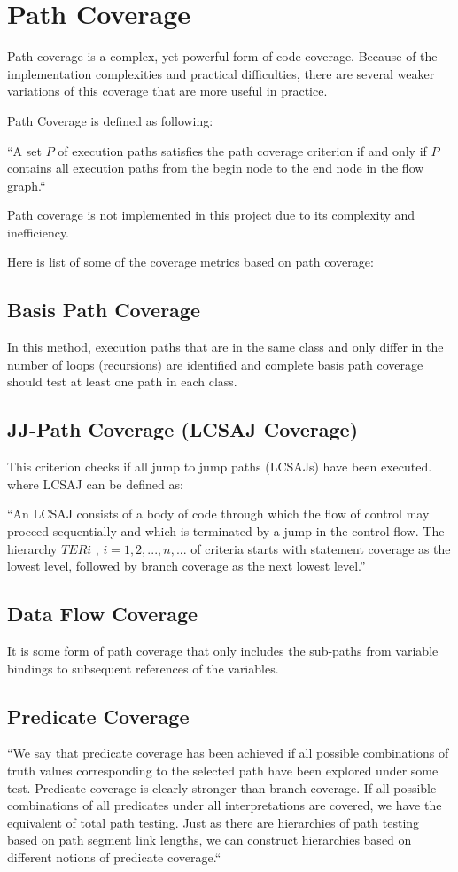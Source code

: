 \documentclass[12pt,a4paper]{report}
\begin{document}
\section{Path Coverage}
Path coverage is a complex, yet powerful form of code coverage. Because of the implementation complexities and practical difficulties, there are several
 weaker variations of this coverage that are more useful in practice. 

Path Coverage is defined as following:

“A set $P$ of execution paths satisfies the path coverage criterion if and only if $P$ contains all execution paths from the begin node to the end node in
 the flow graph.“\cite{Zhu:1997:SUT:267580.267590}

Path coverage is not implemented in this project due to its complexity and inefficiency. 

Here is list of some of the coverage metrics based on path coverage:
\subsection{Basis Path Coverage}
In this method, execution paths that are in the same class and only differ in the number of loops (recursions) are identified and complete basis path
 coverage should test at least one path in each class.

\subsection{JJ-Path Coverage (LCSAJ Coverage)}
This criterion checks if all jump to jump paths (LCSAJs) have been executed.
where LCSAJ can be defined as:

“An LCSAJ consists of a body of code through which the flow of control may proceed sequentially and which is terminated by a jump in the control flow. The
 hierarchy $TERi$ , $i = 1, 2, . . . ,n, . . .$ of criteria starts with statement coverage as the lowest level, followed by branch coverage as the next
 lowest level.”\cite{Zhu:1997:SUT:267580.267590}

\subsection{Data Flow Coverage}
It is some form of path coverage that only includes the sub-paths from variable bindings to subsequent references of the variables.
 
\subsection{Predicate Coverage}
“We say that predicate coverage has been achieved if all possible combinations of truth values corresponding to the selected path have been explored under
 some test. Predicate coverage is clearly stronger than branch coverage. If all possible combinations of all predicates under all interpretations are
 covered, we have the equivalent of total path testing. Just as there are hierarchies of path testing based on path segment link lengths, we can construct
 hierarchies based on different notions of predicate coverage.“\cite{beizer2002software}
\end{document}
